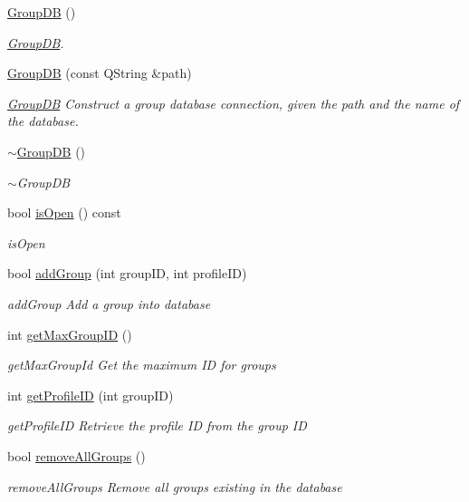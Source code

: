 \begin{DoxyCompactItemize}
\item 
\hyperlink{classGroupDB_a96a4bde4f06f8318fce0a35027386f0d}{Group\+DB} ()
\begin{DoxyCompactList}\small\item\em \hyperlink{classGroupDB}{Group\+DB}. \end{DoxyCompactList}\item 
\hyperlink{classGroupDB_a5a204e106575e3c1060a713d0ca37eba}{Group\+DB} (const Q\+String \&path)
\begin{DoxyCompactList}\small\item\em \hyperlink{classGroupDB}{Group\+DB} Construct a group database connection, given the path and the name of the database. \end{DoxyCompactList}\item 
\hyperlink{classGroupDB_acf4face75bc1bfdd6b5560892e8c2662}{$\sim$\+Group\+DB} ()
\begin{DoxyCompactList}\small\item\em $\sim$\+Group\+DB \end{DoxyCompactList}\item 
bool \hyperlink{classGroupDB_a27d0350c082d93aed3200e07a22eb3ea}{is\+Open} () const 
\begin{DoxyCompactList}\small\item\em is\+Open \end{DoxyCompactList}\item 
bool \hyperlink{classGroupDB_af712d7133acb6d54a4c5771a1b299147}{add\+Group} (int group\+ID, int profile\+ID)
\begin{DoxyCompactList}\small\item\em add\+Group Add a group into database \end{DoxyCompactList}\item 
int \hyperlink{classGroupDB_aac86cfedb0ae4f8ea9b7886057381344}{get\+Max\+Group\+ID} ()
\begin{DoxyCompactList}\small\item\em get\+Max\+Group\+Id Get the maximum ID for groups \end{DoxyCompactList}\item 
int \hyperlink{classGroupDB_a808e067d3e6ffc951875381f575c7bd0}{get\+Profile\+ID} (int group\+ID)
\begin{DoxyCompactList}\small\item\em get\+Profile\+ID Retrieve the profile ID from the group ID \end{DoxyCompactList}\item 
bool \hyperlink{classGroupDB_a0bee74ed271773d6df96a8f046c59ab0}{remove\+All\+Groups} ()
\begin{DoxyCompactList}\small\item\em remove\+All\+Groups Remove all groups existing in the database \end{DoxyCompactList}\end{DoxyCompactItemize}


